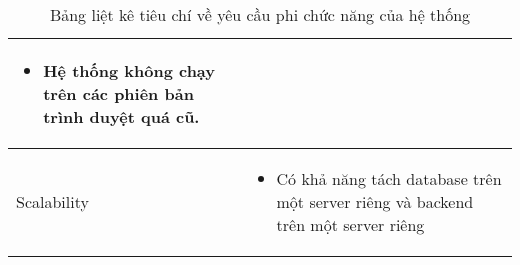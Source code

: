 \begin{table}[H]
{\begin{tabular}{ |m{2.5cm}|m{11.5cm}|}
\begin{itemize}
                        \item Hệ thống không chạy trên các phiên bản trình duyệt quá cũ.
                  \end{itemize}\\
                  \hline
                  Scalability    & 
                  \begin{itemize}
                        \item Có khả năng tách database trên một server riêng và backend trên một
                        server riêng
                  \end{itemize}\\
                  \hline
            \end{tabular} 
}
      \caption{Bảng liệt kê tiêu chí về yêu cầu phi chức năng của hệ thống}
\end{table}

